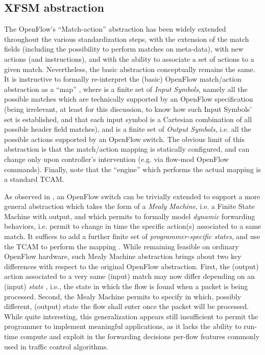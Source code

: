 \documentclass{sig-alternate}
\begin{document}
\subsection{XFSM abstraction}
\label{ss:xfsm}
The OpenFlow's ``Match-action'' abstraction has been widely extended throughout the various standardization steps, with the extension of the match fields (including the possibility to perform matches on meta-data), with new actions (and instructions), and with the ability to associate a set of actions to a given match. Nevertheless, the basic abstraction conceptually remains the same. It is instructive to formally re-interpret the (basic) OpenFlow match/action abstraction as a ``map'' , where  is a finite set of {\em Input Symbols}, namely all the possible matches which are technically supported by an OpenFlow specification (being irrelevant, at least for this discussion, to know how such Input Symbols' set  is established, and that each input symbol is a Cartesian combination of all possible header field matches), and  is a finite set of {\em Output Symbols}, i.e. all the possible actions supported by an OpenFlow switch. The obvious limit of this abstraction is that the match/action mapping is statically configured, and can change only upon controller's intervention (e.g. via flow-mod OpenFlow commands). Finally, note that the ``engine'' which performs the actual mapping  is a standard TCAM.

As observed in \cite{ccr14}, an OpenFlow switch can be trivially extended to support a more general abstraction which takes the form of a {\em Mealy Machine}, i.e. a Finite State Machine with output,
and which permits to formally model {\em dynamic} forwarding behaviors, i.e. permit to change in time the specific action(s) associated to a same match. It suffices to add a further finite set  of {\em programmer-specific states}, and use the TCAM to perform the mapping . While remaining feasible on ordinary OpenFlow hardware, such Mealy Machine abstraction brings about two key differences with respect to the original OpenFlow abstraction. First, the (output) action associated to a very same (input) match may now differ depending on an (input) {\em state} , i.e., the state in which the flow is found when a packet is being processed. Second, the Mealy Machine permits to specify in which, possibly different, (output) state  the flow shall enter once the packet will be processed. While quite interesting, this generalization appears still insufficient to permit the programmer to implement meaningful applications, as it lacks the ability to run-time compute and exploit in the forwarding decisions per-flow features commonly used in traffic control algorithms. 
\end{document}
